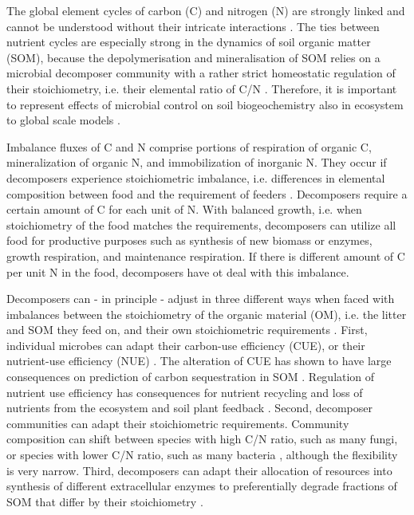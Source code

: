 
\introduction
The global element cycles of carbon (C) and nitrogen (N) are strongly linked and
cannot be understood without their intricate interactions
\citep{Thornton07,Janssens10, Zaehle11}.
The ties between nutrient cycles are especially strong in the dynamics of soil
organic matter (SOM), because the depolymerisation and mineralisation of SOM
relies on a microbial decomposer community with a rather strict homeostatic
regulation of their stoichiometry, i.e. their elemental ratio of C/N \citep{Sterner02,
Zechmeister15}. Therefore, it is important to represent effects of microbial
control on soil biogeochemistry also in ecosystem to global scale models
\citep{Todd-Brown12, Xu14}.  

Imbalance fluxes of C and N comprise portions of respiration of organic C,
mineralization of organic N, and immobilization of inorganic N. They occur if
decomposers experience stoichiometric imbalance, i.e. differences in elemental
composition between food and the requirement of feeders \citep{Sterner02}.
Decomposers require a certain amount of C for each unit of N.
With balanced growth, i.e. when stoichiometry of the food matches
the requirements, decomposers can utilize all food for productive
purposes such as synthesis of new biomass or enzymes, growth respiration, and maintenance
respiration. If there is different amount of C per unit N in the food,
decomposers have ot deal with this imbalance.
 
Decomposers can - in principle - adjust in three different ways when faced with
imbalances between the stoichiometry of the organic material (OM), i.e. the
litter and SOM they feed on, and their own stoichiometric requirements
\citep{Mooshammer14}.
First, individual microbes can adapt their carbon-use efficiency (CUE), or their
nutrient-use efficiency (NUE) \citep{Sinsabaugh13}. The alteration of CUE has
shown to have large consequences on prediction of carbon sequestration in SOM
\citep{Allison14a, Wieder13}.
Regulation of nutrient use efficiency has consequences for nutrient recycling
and loss of nutrients from the ecosystem \citep{Mooshammer14a} and soil plant
feedback \citep{Rastetter11}.
Second, decomposer communities can adapt their stoichiometric requirements.
Community composition can shift between species with high C/N ratio, such as
many fungi, or species with lower C/N ratio, such as many bacteria
\citep{Cleveland07, Xu13}, although the flexibility is very narrow.
Third, decomposers can adapt their allocation of resources into synthesis of
different extracellular enzymes to preferentially degrade fractions of SOM that
differ by their stoichiometry \citep{Moorhead12}. 

